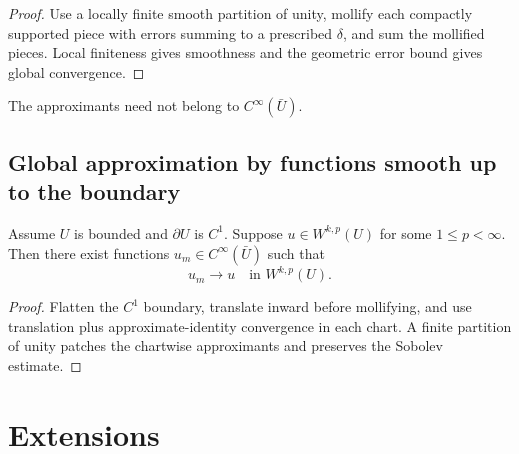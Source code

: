 \begin{proof}
\sketch Use a locally finite smooth partition of unity, mollify each compactly supported piece with errors summing to a prescribed $\delta$, and sum the mollified pieces. Local finiteness gives smoothness and the geometric error bound gives global convergence.
\end{proof}

\begin{remark}
\label{rem:approximation-not-up-to-boundary}
The approximants need not belong to $C^\infty(\bar U)$.
\end{remark}

\subsection{Global approximation by functions smooth up to the boundary}

\begin{theorem}
\label{thm:global-smooth-approximation-boundary}
Assume $U$ is bounded and $\partial U$ is $C^1$. Suppose $u \in W^{k,p}(U)$ for some $1 \le p < \infty$. Then there exist functions $u_m \in C^\infty(\bar U)$ such that
$$u_m \to u \quad \text{in } W^{k,p}(U).$$
\end{theorem}

\begin{proof}
\sketch Flatten the $C^1$ boundary, translate inward before mollifying, and use translation plus approximate-identity convergence in each chart. A finite partition of unity patches the chartwise approximants and preserves the Sobolev estimate.
\end{proof}

\section{Extensions}
\label{sec:sobolev-extensions}

